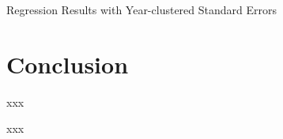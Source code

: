 \documentclass[10pt,t,aspectratio=169]{beamer}
\begin{document}
\begin{frame}[shrink=35]{Regression Results with Year-clustered Standard Errors}

\begin{table}[htp]
    \centering
    \caption{\bf{Regression Results with Year-clustered Standard Errors}}
    \label{tab:regression}
       
\end{table}
  
\end{frame}

\section{Conclusion}

\begin{frame}{xxx}

    xxx
  
\end{frame}
\end{document}
